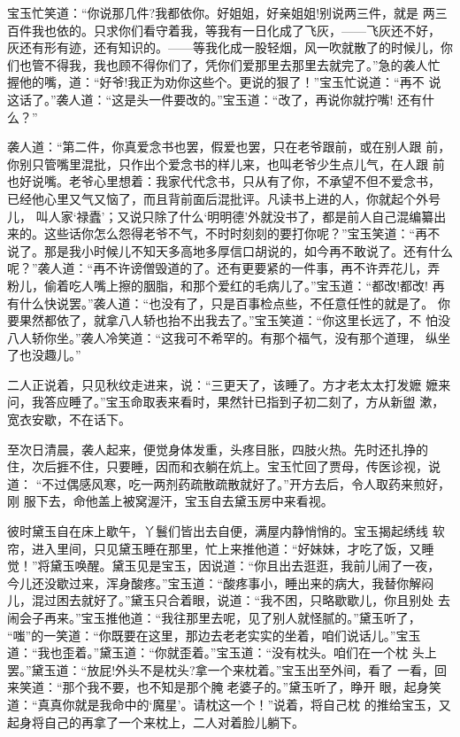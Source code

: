 宝玉忙笑道：“你说那几件?我都依你。好姐姐，好亲姐姐!别说两三件，就是
两三百件我也依的。只求你们看守着我，等我有一日化成了飞灰，——飞灰还不好，
灰还有形有迹，还有知识的。——等我化成一股轻烟，风一吹就散了的时候儿，你
们也管不得我，我也顾不得你们了，凭你们爱那里去那里去就完了。”急的袭人忙
握他的嘴，道：“好爷!我正为劝你这些个。更说的狠了！”宝玉忙说道：“再不
说这话了。”袭人道：“这是头一件要改的。”宝玉道：“改了，再说你就拧嘴!
还有什么？”

袭人道：“第二件，你真爱念书也罢，假爱也罢，只在老爷跟前，或在别人跟
前，你别只管嘴里混批，只作出个爱念书的样儿来，也叫老爷少生点儿气，在人跟
前也好说嘴。老爷心里想着：我家代代念书，只从有了你，不承望不但不爱念书，
已经他心里又气又恼了，而且背前面后混批评。凡读书上进的人，你就起个外号儿，
叫人家‘禄蠹’；又说只除了什么‘明明德’外就没书了，都是前人自己混编纂出
来的。这些话你怎么怨得老爷不气，不时时刻刻的要打你呢？”宝玉笑道：“再不
说了。那是我小时候儿不知天多高地多厚信口胡说的，如今再不敢说了。还有什么
呢？”袭人道：“再不许谤僧毁道的了。还有更要紧的一件事，再不许弄花儿，弄
粉儿，偷着吃人嘴上擦的胭脂，和那个爱红的毛病儿了。”宝玉道：“都改!都改!
再有什么快说罢。”袭人道：“也没有了，只是百事检点些，不任意任性的就是了。
你要果然都依了，就拿八人轿也抬不出我去了。”宝玉笑道：“你这里长远了，不
怕没八人轿你坐。”袭人冷笑道：“这我可不希罕的。有那个福气，没有那个道理，
纵坐了也没趣儿。”

二人正说着，只见秋纹走进来，说：“三更天了，该睡了。方才老太太打发嬷
嬷来问，我答应睡了。”宝玉命取表来看时，果然针已指到子初二刻了，方从新盥
漱，宽衣安歇，不在话下。

至次日清晨，袭人起来，便觉身体发重，头疼目胀，四肢火热。先时还扎挣的
住，次后捱不住，只要睡，因而和衣躺在炕上。宝玉忙回了贾母，传医诊视，说道：
“不过偶感风寒，吃一两剂药疏散疏散就好了。”开方去后，令人取药来煎好，刚
服下去，命他盖上被窝渥汗，宝玉自去黛玉房中来看视。

彼时黛玉自在床上歇午，丫鬟们皆出去自便，满屋内静悄悄的。宝玉揭起绣线
软帘，进入里间，只见黛玉睡在那里，忙上来推他道：“好妹妹，才吃了饭，又睡
觉！”将黛玉唤醒。黛玉见是宝玉，因说道：“你且出去逛逛，我前儿闹了一夜，
今儿还没歇过来，浑身酸疼。”宝玉道：“酸疼事小，睡出来的病大，我替你解闷
儿，混过困去就好了。”黛玉只合着眼，说道：“我不困，只略歇歇儿，你且别处
去闹会子再来。”宝玉推他道：“我往那里去呢，见了别人就怪腻的。”黛玉听了，
“嗤”的一笑道：“你既要在这里，那边去老老实实的坐着，咱们说话儿。”宝玉
道：“我也歪着。”黛玉道：“你就歪着。”宝玉道：“没有枕头。咱们在一个枕
头上罢。”黛玉道：“放屁!外头不是枕头?拿一个来枕着。”宝玉出至外间，看了
一看，回来笑道：“那个我不要，也不知是那个腌老婆子的。”黛玉听了，睁开
眼，起身笑道：“真真你就是我命中的‘魔星’。请枕这一个！”说着，将自己枕
的推给宝玉，又起身将自己的再拿了一个来枕上，二人对着脸儿躺下。

